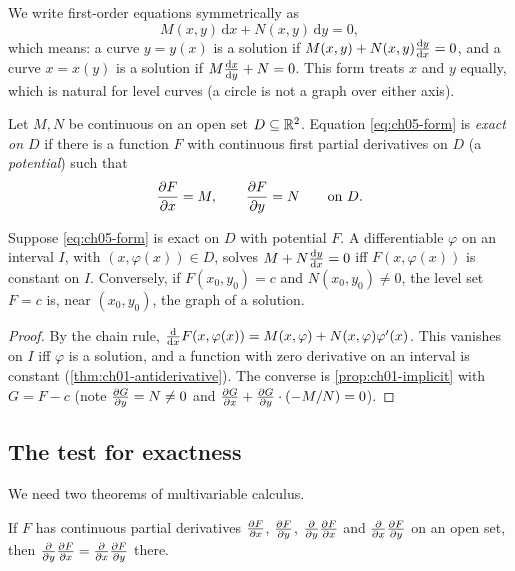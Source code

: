 
We write first-order equations symmetrically as
\begin{equation}\label{eq:ch05-form}
  M(x,y)\,\mathrm{d}x + N(x,y)\,\mathrm{d}y = 0,
\end{equation}
which means: a curve $y = y(x)$ is a solution if
$M(x,y) + N(x,y)\frac{\mathrm{d}y}{\mathrm{d}x} = 0$, and a curve $x = x(y)$ is a solution if
$M\frac{\mathrm{d}x}{\mathrm{d}y} + N = 0$. This form treats $x$ and $y$ equally, which is natural
for level curves (a circle is not a graph over either axis).

\begin{definition}[Exact]\label{def:ch05-exact}
Let $M, N$ be continuous on an open set $D\subseteq\mathbb{R}^2$. Equation
\eqref{eq:ch05-form} is \emph{exact on $D$} if there is a function $F$ with
continuous first partial derivatives on $D$ (a \emph{potential}) such that
\[
  \frac{\partial F}{\partial x} = M,\qquad \frac{\partial F}{\partial y} = N\qquad\text{on } D .
\]
\end{definition}

\begin{theorem}\label{thm:ch05-level}
Suppose \eqref{eq:ch05-form} is exact on $D$ with potential $F$. A
differentiable $\varphi$ on an interval $I$, with $(x,\varphi(x))\in D$, solves
$M + N\frac{\mathrm{d}y}{\mathrm{d}x} = 0$ iff $F(x,\varphi(x))$ is constant on $I$. Conversely, if
$F(x_0,y_0) = c$ and $N(x_0,y_0)\neq 0$, the level set $F = c$ is, near
$(x_0,y_0)$, the graph of a solution.
\end{theorem}
\begin{proof}
By the chain rule, $\frac{\mathrm{d}}{\mathrm{d}x}F(x,\varphi(x)) = M(x,\varphi) + N(x,\varphi)\varphi'(x)$.
This vanishes on $I$ iff $\varphi$ is a solution, and a function with zero
derivative on an interval is constant (\cref{thm:ch01-antiderivative}). The
converse is \cref{prop:ch01-implicit} with $G = F - c$ (note
$\frac{\partial G}{\partial y} = N\neq 0$ and $\frac{\partial G}{\partial x} + \frac{\partial G}{\partial y}\cdot(-M/N) = 0$).
\end{proof}

\subsection{The test for exactness}

We need two theorems of multivariable calculus.

\begin{theorem}\label{thm:ch05-schwarz}
If $F$ has continuous partial derivatives $\frac{\partial F}{\partial x}$, $\frac{\partial F}{\partial y}$,
$\frac{\partial }{\partial y}\frac{\partial F}{\partial x}$ and $\frac{\partial }{\partial x}\frac{\partial F}{\partial y}$ on an open set, then
$\frac{\partial }{\partial y}\frac{\partial F}{\partial x} = \frac{\partial }{\partial x}\frac{\partial F}{\partial y}$ there.
\end{theorem}

